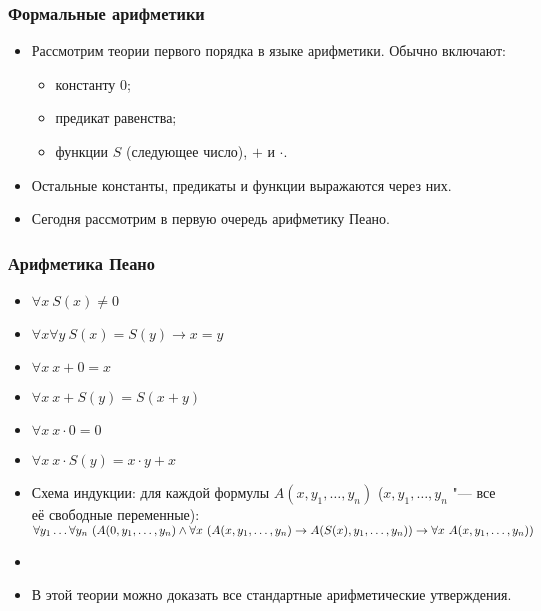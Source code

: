 \documentclass[10pt]{beamer}
\begin{document}
\begin{frame}
    \frametitle{Формальные арифметики}
    \begin{itemize}
        \item Рассмотрим теории первого порядка в языке арифметики. Обычно включают:
        \begin{itemize}
            \item константу $0$;
            \item предикат равенства;
            \item функции $S$ (следующее число), $+$ и $\cdot$.
        \end{itemize}
        \item Остальные константы, предикаты и функции выражаются через них.
        \item Сегодня рассмотрим в первую очередь арифметику Пеано.
    \end{itemize}
\end{frame}

\begin{frame}
    \frametitle{Арифметика Пеано}
    \begin{itemize}
        \item $\forall x ~ S(x) \neq 0$
        \item $\forall x \forall y ~ S(x) = S(y) \to x = y$
        \item $\forall x ~ x + 0 = x$
        \item $\forall x ~ x + S(y) = S(x+y)$
        \item $\forall x ~ x \cdot 0 = 0$
        \item $\forall x ~ x \cdot S(y) = x \cdot y + x$
        \item Схема индукции: для каждой формулы $A(x,y_1,\ldots,y_n)$ ($x,y_1,\ldots,y_n$ "--- все её свободные переменные): \\
        $\forall y_1 \ldots \forall y_n ~ (A(0,y_1,\ldots,y_n) \land \linebreak \forall x ~ (A(x,y_1,\ldots,y_n) \to A(S(x),y_1,\ldots,y_n)) \to \linebreak \forall x ~ A(x,y_1,\ldots,y_n))$
        \item[]
        \item В этой теории можно доказать все стандартные арифметические утверждения.
    \end{itemize}
\end{frame}
\end{document}
